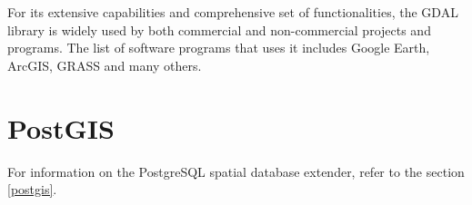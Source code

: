   For its extensive capabilities and comprehensive set of
  functionalities, the GDAL library is widely used by both
  commercial and non-commercial  projects and programs. The
  list of software programs that uses it includes Google Earth,
  ArcGIS, GRASS  and many others.\cite{gdalogr}

  
  \section{PostGIS}
  
  For information on the PostgreSQL spatial database extender, refer
  to the section \ref{postgis}.

